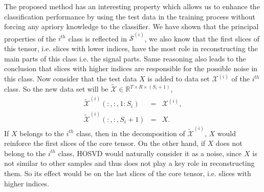 \documentclass[preprint,12pt]{elsarticle}
\begin{document}
The proposed method has an interesting property which allows us to enhance the classification performance by using the test data in the training process without forcing any apriory knowledge to the classifier. 
We have shown that the principal properties of the $i^{th}$ class is reflected in $\overline{\mathcal{S}}^{(i)}$, we also know that the first slices of this tensor, i.e. slices with lower indices, have the most role in reconstructing the main parts of this class i.e. the signal parts. Same reasoning also leads to the conclusion that slices with higher indices are responsible for the possible noise in this class.   
Now consider that the test data $X$ is added to data set $\mathcal{X}^{(i)}$ of the $i^{th}$ class. So the new data set will be
$\mathcal{\widetilde{X}}\in \mathbb{R}^{T\times R \times (S_{i}+1)}$,
\begin{eqnarray*}
	\widetilde{\mathcal{X}}^{(i)}(:,:,1:S_i)&=&{\mathcal{X}}^{(i)},\\
	\widetilde{\mathcal{X}}^{(i)}(:,:,S_i+1)&=&X.
\end{eqnarray*}
If $X$ belongs to the $i^{th}$ class, then in the decomposition of $\widetilde{\mathcal{X}}^{(i)}$, $X$ would reinforce the first slices of the core tensor. On the other hand, if $X$ does not belong to the $i^{th}$ class, HOSVD would naturally consider it as a noise, since $X$ is not similar to other samples and thus does not play a key role in reconstructing them. So its effect would be on the last slices of the core tensor, i.e. slices with higher indices.
\end{document}
